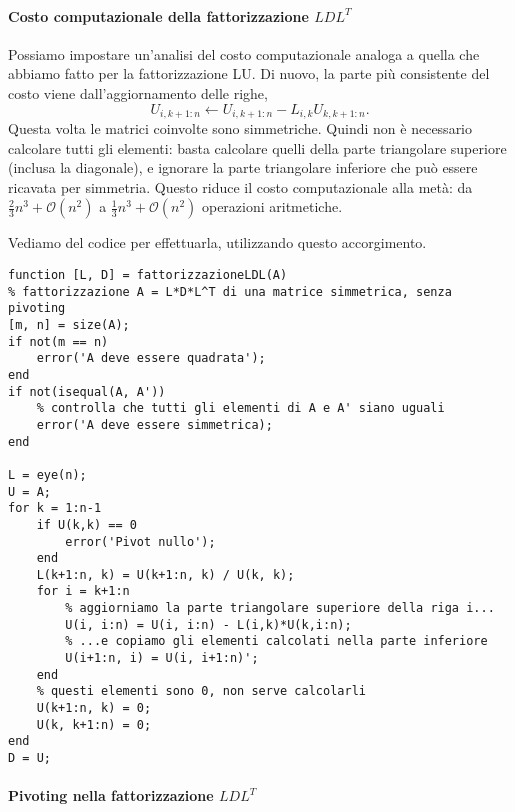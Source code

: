 \documentclass[a4paper]{report}
\theoremstyle{definiton}
\theoremstyle{remark}
\begin{document}
\paragraph{Costo computazionale della fattorizzazione $LDL^T$}

Possiamo impostare un'analisi del costo computazionale analoga a quella che abbiamo fatto per la fattorizzazione LU. Di nuovo, la parte più consistente del costo viene dall'aggiornamento delle righe, 
\[
U_{i,k+1:n} \gets U_{i,k+1:n} - L_{i,k}U_{k,k+1:n}.
\]
Questa volta le matrici coinvolte sono simmetriche. Quindi non è necessario calcolare tutti gli elementi: basta calcolare quelli della parte triangolare superiore (inclusa la diagonale), e ignorare la parte triangolare inferiore che può essere ricavata per simmetria. Questo riduce il costo computazionale alla metà: da $\frac23 n^3 + \mathcal{O}(n^2)$ a $\frac13n^3 + \mathcal{O}(n^2)$ operazioni aritmetiche.

Vediamo del codice per effettuarla, utilizzando questo accorgimento.
\begin{lstlisting}
function [L, D] = fattorizzazioneLDL(A)
% fattorizzazione A = L*D*L^T di una matrice simmetrica, senza pivoting
[m, n] = size(A);
if not(m == n)
    error('A deve essere quadrata');
end
if not(isequal(A, A'))
    % controlla che tutti gli elementi di A e A' siano uguali
    error('A deve essere simmetrica);
end

L = eye(n);
U = A;     
for k = 1:n-1
    if U(k,k) == 0
        error('Pivot nullo');
    end
    L(k+1:n, k) = U(k+1:n, k) / U(k, k);
    for i = k+1:n
        % aggiorniamo la parte triangolare superiore della riga i...
        U(i, i:n) = U(i, i:n) - L(i,k)*U(k,i:n);
        % ...e copiamo gli elementi calcolati nella parte inferiore
        U(i+1:n, i) = U(i, i+1:n)';
    end
    % questi elementi sono 0, non serve calcolarli
    U(k+1:n, k) = 0;
    U(k, k+1:n) = 0;
end
D = U;        
\end{lstlisting}

\paragraph{Pivoting nella fattorizzazione $LDL^T$}
\end{document}
